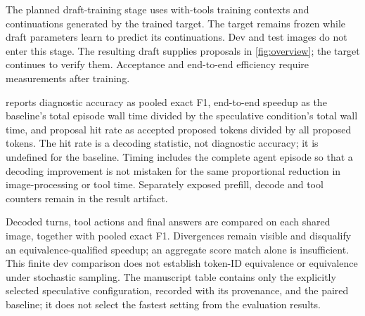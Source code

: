 The planned draft-training stage uses with-tools training contexts and continuations generated
by the trained target. The target remains frozen while draft parameters learn to predict its
continuations. Dev and test images do not enter this stage. The resulting draft supplies proposals
in \cref{fig:overview}; the target continues to verify them. Acceptance and
end-to-end efficiency require measurements after training.

 reports diagnostic accuracy as pooled exact F1, end-to-end
speedup as the baseline's total episode wall time divided by the speculative condition's total
wall time, and proposal hit rate as accepted proposed tokens divided by all proposed tokens.
The hit rate is a decoding statistic, not diagnostic accuracy; it is undefined for the baseline.
Timing includes the complete agent episode so that a decoding improvement is not mistaken for
the same proportional reduction in image-processing or tool time. Separately exposed prefill,
decode and tool counters remain in the result artifact.

Decoded turns, tool actions and final answers are compared on each shared image, together
with pooled exact F1. Divergences remain visible and disqualify an equivalence-qualified
speedup; an aggregate score match alone is insufficient. This finite dev comparison does not
establish token-ID equivalence or equivalence under stochastic sampling. The manuscript table
contains only the explicitly selected speculative configuration, recorded with its provenance,
and the paired baseline; it does not select the fastest setting from the evaluation results.



